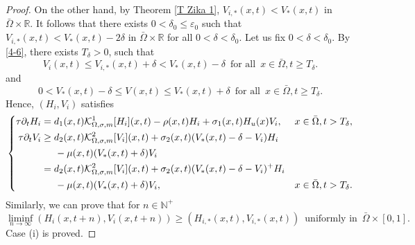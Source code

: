 \documentclass[11pt,reqno]{amsart}
\numberwithin{equation}{section}
\begin{document}
\begin{proof}
On the other hand, by Theorem \ref{T Zika 1}, $V_{i,*}(x,t)<V_{*}(x,t)$ in $\bar\Omega \times \mathbb{R}$.
It follows that there exists $0<\delta_{0}\le\varepsilon_{0}$ such that
$V_{i,*}(x,t)<V_{*}(x,t)-2\delta$ in $\bar\Omega \times \mathbb{R}$ for all $0<\delta<\delta_{0}$.
Let us fix $0<\delta< \delta_{0}$.
By \eqref{4-6}, there exists $T_{\delta} > 0$, such that
\begin{equation*}
V_{i}(x,t) \leq V_{i,*}(x,t) + \delta < V_{*}(x,t) - \delta \enspace\text{for all}\enspace  x\in\bar{\Omega}, t\geq T_{\delta}.
\end{equation*}
and
\begin{equation*}
0<V_{*}(x,t)-\delta\le V(x,t) \le V_{*}(x,t)+\delta \enspace\text{for all}\enspace  x\in\bar{\Omega}, t\geq T_{\delta}.
\end{equation*}
Hence, $(H_{i},V_{i})$ satisfies
\begin{equation*}
\left\{
\begin{aligned}
 \tau \partial_{t} H_{i}
&=d_{1}(x,t) \mathcal{K}^{1}_{\Omega,\sigma,m}[H_{i}](x,t)-\rho(x,t)H_{i}+\sigma_{1}(x,t)H_{u}(x)V_{i}, &x&\in \bar\Omega, t>T_{\delta},\\
 \tau \partial_{t} V_{i}
&\geq d_{2}(x,t)\mathcal{K}^{2}_{\Omega,\sigma,m}[V_{i}](x,t)+\sigma_{2}(x,t)(V_{*}(x,t)-\delta-V_{i})H_{i}\\
&\hspace{0.5cm} -\mu(x,t)(V_{*}(x,t)+\delta)V_{i}\\
&=d_{2}(x,t)\mathcal{K}^{2}_{\Omega,\sigma,m}[V_{i}](x,t)+\sigma_{2}(x,t)(V_{*}(x,t)-\delta-V_{i})^{+}H_{i}\\
&\hspace{0.5cm} -\mu(x,t)(V_{*}(x,t)+\delta)V_{i}, &x&\in \bar\Omega, t>T_{\delta}.
\end{aligned}
\right.
\end{equation*}
Similarly, we can prove that for $n\in\mathbb{N}^{+}$
\begin{equation*}
\liminf_{n\to\infty} (H_{i}(x,t+n),V_{i}(x,t+n)) \geq
(H_{i,*}(x,t),V_{i,*}(x,t))
\enspace \text{uniformly in} \enspace \bar{\Omega}\times[0,1].
\end{equation*}
Case (i) is proved.


\end{proof}
\end{document}
